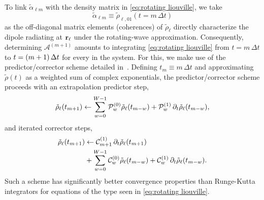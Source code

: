 To link $\tilde{\alpha}_{\ell m}$ with the density matrix in \cref{eq:rotating liouville}, we take
\begin{equation}
  \tilde{\alpha}_{\ell m} \equiv \tilde{\rho}_{\ell, 01}(t = m \, \Delta t)
  \label{eq:polarization definition}
\end{equation}
as the off-diagonal matrix elements (coherences) of $\tilde{\rho}_{\ell}$ directly characterize the dipole radiating at $\vb{r}_\ell$ under the rotating-wave approximation.
Consequently, determining $\mathcal{A}^{(m + 1)}$ amounts to integrating \cref{eq:rotating liouville} from $t = m \, \Delta t$ to $t = \qty(m + 1) \, \Delta t$ for every \qd{} in the system.
For this, we make use of the predictor/corrector scheme detailed in~\cite{Glaser2009}.
Defining $t_m \equiv m \, \Delta t$ and approximating $\tilde{\rho}(t)$ as a weighted sum of complex exponentials, the predictor/corrector scheme proceeds with an extrapolation predictor step,
\begin{equation}
  \tilde{\rho}_\ell(t_{m + 1}) \leftarrow \sum_{w = 0}^{W-1} \mathcal{P}_w^{\qty(0)} \tilde{\rho}_\ell(t_{m-w}) + \mathcal{P}_w^{\qty(1)} \, \partial_t \tilde{\rho}_\ell(t_{m-w}),
  \label{eq:predictor}
\end{equation}
and iterated corrector steps,
\begin{equation}
  \begin{aligned}
    \tilde{\rho}_\ell(t_{m + 1}) &\leftarrow \mathcal{C}_{m+1}^{\qty(1)} \, \partial_t \tilde{\rho}_\ell(t_{m+1}) \\
                                 &+ \sum_{w = 0}^{W - 1} \mathcal{C}_w^{\qty(0)} \tilde{\rho}_\ell(t_{m-w}) + \mathcal{C}_w^{\qty(1)} \, \partial_t \tilde{\rho}_\ell(t_{m-w}).
  \end{aligned}
  \label{eq:corrector}
\end{equation}
Such a scheme has significantly better convergence properties than Runge-Kutta integrators for equations of the type seen in \cref{eq:rotating liouville}.


